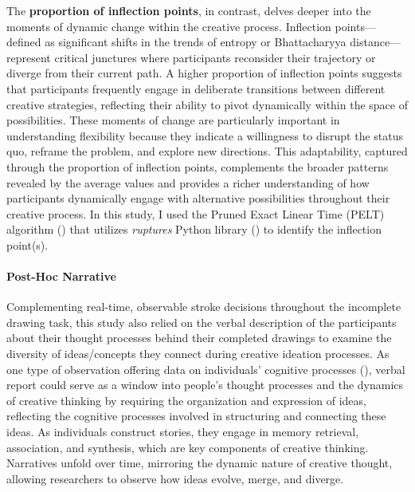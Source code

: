 \documentclass[../MA_Thesis.tex]{subfiles}
\begin{document}
The \textbf{proportion of inflection points}, in contrast, delves deeper into the moments of dynamic change within the creative process. Inflection points—defined as significant shifts in the trends of entropy or Bhattacharyya distance—represent critical junctures where participants reconsider their trajectory or diverge from their current path. A higher proportion of inflection points suggests that participants frequently engage in deliberate transitions between different creative strategies, reflecting their ability to pivot dynamically within the space of possibilities. These moments of change are particularly important in understanding flexibility because they indicate a willingness to disrupt the status quo, reframe the problem, and explore new directions. This adaptability, captured through the proportion of inflection points, complements the broader patterns revealed by the average values and provides a richer understanding of how participants dynamically engage with alternative possibilities throughout their creative process. In this study, I used the Pruned Exact Linear Time (PELT) algorithm (\cite{dorcas_wambui_power_2015}) that utilizes \textit{ruptures} Python library (\cite{truong_selective_2020}) to identify the inflection point(s).

\paragraph*{Post-Hoc Narrative}
Complementing real-time, observable stroke decisions throughout the incomplete drawing task, this study also relied on the verbal description of the participants about their thought processes behind their completed drawings to examine the diversity of ideas/concepts they connect during creative ideation processes. As one type of observation offering data on individuals' cognitive processes (\cite{ericsson_verbal_2003}), verbal report could serve as a window into people's thought processes and the dynamics of creative thinking by requiring the organization and expression of ideas, reflecting the cognitive processes involved in structuring and connecting these ideas. As individuals construct stories, they engage in memory retrieval, association, and synthesis, which are key components of creative thinking. Narratives unfold over time, mirroring the dynamic nature of creative thought, allowing researchers to observe how ideas evolve, merge, and diverge.
\end{document}
